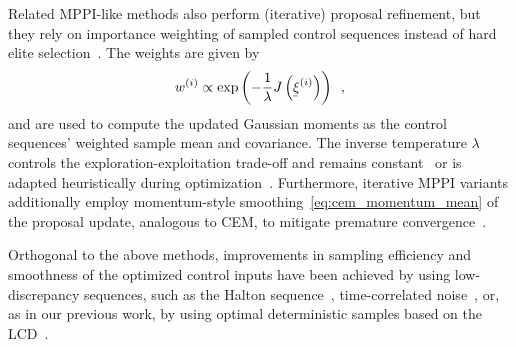 Related \ac{MPPI}-like methods also perform (iterative) proposal refinement, but they rely on importance weighting of sampled control sequences instead of hard elite selection~\cite{arXiv26_Walker_IFAC}.
The weights are given by
\begin{align}
    \label{eq:imp_weights}
    w^{(i)} \propto \exp\left(-\frac{1}{\lambda} J\left(\vVarCem^{(i)}\right) \right) \enspace,
\end{align}
and are used to compute the updated Gaussian moments as the control sequences' weighted sample mean and covariance.
The inverse temperature $\lambda$ controls the exploration-exploitation trade-off and remains constant~\cite{williamsInformationtheoretic2018} or is adapted heuristically during optimization~\cite{pezzatoSamplingbasedModelPredictive2025}.
Furthermore, iterative \ac{MPPI} variants additionally employ momentum-style smoothing~\cref{eq:cem_momentum_mean} of the proposal update, analogous to \ac{CEM}, to mitigate premature convergence~\cite{bhardwajSTORMIntegratedFramework2022}.

Orthogonal to the above methods, improvements in sampling efficiency and smoothness of the optimized control inputs have been achieved by using low-discrepancy sequences, such as the Halton sequence~\cite{bhardwajSTORMIntegratedFramework2022}, time-correlated noise~\cite{pinneriSampleefficientCrossentropyMethod2021}, or, as in our previous work, by using optimal deterministic samples based on the \ac{LCD}~\cite{walkerSampleefficientSmoothCrossentropy2026,arXiv26_Walker_IFAC}.


